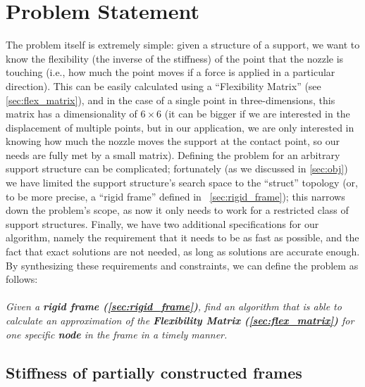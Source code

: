 \section{Problem Statement}
\label{sec:stiff_problem_statement}
The problem itself is extremely simple: given a structure of a support, we want to know the flexibility (the inverse of the stiffness)
of the point that the nozzle is touching
(i.e., how much the point moves if a force is applied in a particular direction).
This can be easily calculated using a ``Flexibility Matrix'' (see \cref{sec:flex_matrix}), and in the case of a
single point in three-dimensions, this matrix has a dimensionality of $6 \times  6$ (it can be bigger if we are interested in the 
displacement of multiple points, but in our application, we are only interested in knowing how much the nozzle moves
the support at the contact point, so our needs are fully met by a small matrix).
Defining the problem for an arbitrary support structure can be complicated; fortunately (as we discussed in \cref{sec:obj})
we have limited the support structure's search space to the ``struct'' topology (or, to be more precise, a ``rigid frame'' defined in ~\cref{sec:rigid_frame}); this narrows down the problem's scope, as now it only needs to work for a restricted class of support structures.
Finally, we have two additional specifications for our algorithm, namely the requirement that it needs to be as fast as possible, and the fact 
that exact solutions are not needed, as long as solutions are accurate enough. 
By synthesizing these requirements and constraints, we can define the problem as follows:
\\
\\
\noindent\textit{Given a \textbf{rigid frame (\cref{sec:rigid_frame})}, find an algorithm that is able to calculate
an approximation of the \textbf{Flexibility Matrix (\cref{sec:flex_matrix})} for one specific \textbf{node} in the frame
in a timely manner.}

\subsection{Stiffness of partially constructed frames}
\label{sec:stiffness_part_frames}

